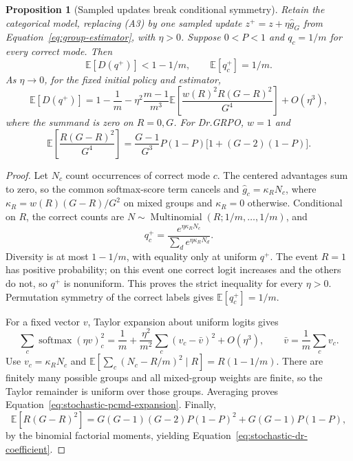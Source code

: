 \documentclass{article}
\newcommand{\enforcehalffinalproseline}{%
  \setlength{\parfillskip}{0pt plus .20\linewidth}}
\newcommand{\1}{\mathbf 1}
\newcommand{\E}{\mathbb E}
\newtheorem{proposition}[lemma]{Proposition}
\theoremstyle{remark}
\theoremstyle{definition}
\theoremstyle{plain}
\begin{document}
\begin{proposition}[Sampled updates break conditional symmetry]
\enforcehalffinalproseline
\label{prop:stochastic-pcmd}
Retain the categorical model, replacing (A3) by one sampled update
$z^+=z+\eta\widehat g_G$ from Equation~\eqref{eq:group-estimator}, with
$\eta>0$. Suppose $0<P<1$ and $q_c=1/m$ for every correct mode. Then
\begin{equation}
 \E[D(q^+)]<1-1/m,
 \qquad \E[q_c^+]=1/m.
 \label{eq:stochastic-strict-decrease}
\end{equation}
As $\eta\to0$, for the fixed initial policy and estimator,
\begin{equation}
 \E[D(q^+)]
 =1-\frac1m
  -\eta^2\frac{m-1}{m^3}
    \E\!\left[\frac{w(R)^2R(G-R)^2}{G^4}\right]
  +O(\eta^3),
 \label{eq:stochastic-pcmd-expansion}
\end{equation}
where the summand is zero on $R=0,G$. For Dr.GRPO, $w=1$ and
\begin{equation}
 \E\!\left[\frac{R(G-R)^2}{G^4}\right]
 =\frac{G-1}{G^3}P(1-P)\big[1+(G-2)(1-P)\big].
 \label{eq:stochastic-dr-coefficient}
\end{equation}
\end{proposition}

\begin{proof}
\enforcehalffinalproseline
Let $N_c$ count occurrences of correct mode $c$. The centered advantages
sum to zero, so the common softmax-score term cancels and
$\widehat g_c=\kappa_RN_c$, where
$\kappa_R=w(R)(G-R)/G^2$ on mixed groups and $\kappa_R=0$ otherwise.
Conditional on $R$, the correct counts are
$N\sim\operatorname{Multinomial}(R;1/m,\ldots,1/m)$, and
\[
 q_c^+=\frac{e^{\eta\kappa_RN_c}}{\sum_de^{\eta\kappa_RN_d}}.
\]
Diversity is at most $1-1/m$, with equality only at uniform $q^+$.
The event $R=1$ has positive probability; on this event one correct logit
increases and the others do not, so $q^+$ is nonuniform. This proves the
strict inequality for every $\eta>0$. Permutation symmetry of the correct
labels gives $\E[q_c^+]=1/m$.

For a fixed vector $v$, Taylor expansion about uniform logits gives
\[
 \sum_c\operatorname{softmax}(\eta v)_c^2
 =\frac1m+\frac{\eta^2}{m^2}\sum_c(v_c-\bar v)^2+O(\eta^3),
 \qquad \bar v=\frac1m\sum_cv_c.
\]
Use $v_c=\kappa_RN_c$ and
$\E[\sum_c(N_c-R/m)^2\mid R]=R(1-1/m)$.
There are finitely many possible groups and all mixed-group weights are
finite, so the Taylor remainder is uniform over those groups. Averaging
proves Equation~\eqref{eq:stochastic-pcmd-expansion}.
Finally,
\[
 \E[R(G-R)^2]
 =G(G-1)(G-2)P(1-P)^2+G(G-1)P(1-P),
\]
by the binomial factorial moments, yielding
Equation~\eqref{eq:stochastic-dr-coefficient}.
\end{proof}
\end{document}
